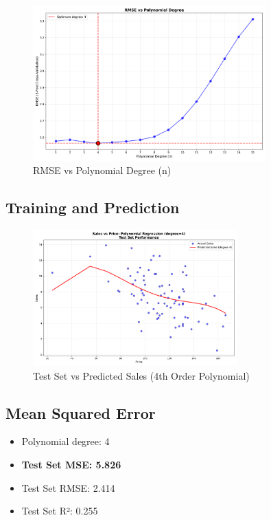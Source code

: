 \documentclass[12pt]{article}
\begin{document}
\begin{figure}[H]
    \centering
    \includegraphics[width=0.8\textwidth]{images/polynomial_degree_rmse.png}
    \caption{RMSE vs Polynomial Degree (n)}
    \label{fig:rmse_polynomial_order}
\end{figure}

\subsection{Training and Prediction}

\begin{figure}[H]
    \centering
    \includegraphics[width=0.7\textwidth]{images/polynomial_prediction.png}
    \caption{Test Set vs Predicted Sales (4th Order Polynomial)}
    \label{fig:poly_prediction}
\end{figure}

\subsection{Mean Squared Error}

\begin{itemize}
    \item Polynomial degree: 4
    \item \textbf{Test Set MSE: 5.826}
    \item Test Set RMSE: 2.414
    \item Test Set R²: 0.255
\end{itemize}
\end{document}
